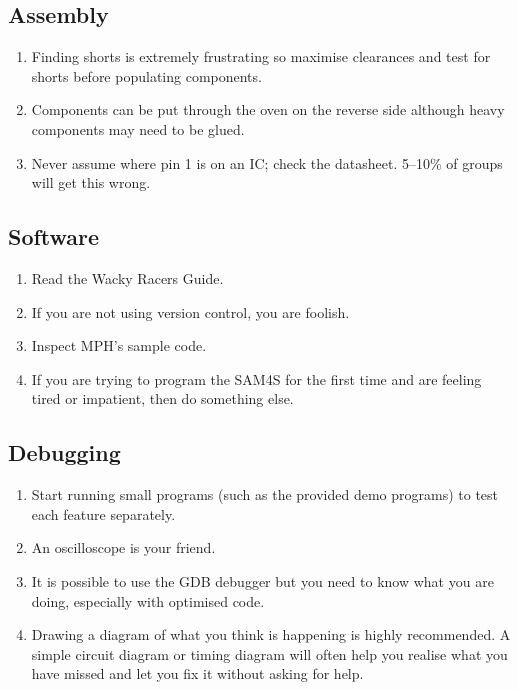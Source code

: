 \documentclass[11pt, a4paper]{article}
\begin{document}
\subsection{Assembly}

\begin{enumerate}
\item Finding shorts is extremely frustrating so maximise clearances
  and test for shorts before populating components.

\item Components can be put through the oven on the reverse side
  although heavy components may need to be glued.

\item Never assume where pin 1 is on an IC; check the datasheet.
  5--10\% of groups will get this wrong.

\end{enumerate}


\subsection{Software}

\begin{enumerate}
\item Read the Wacky Racers Guide.

\item If you are not using version control, you are foolish.

\item Inspect MPH's sample code.

\item If you are trying to program the SAM4S for the first time and
  are feeling tired or impatient, then do something else.  
\end{enumerate}


\subsection{Debugging}

\begin{enumerate}
\item Start running small programs (such as the provided demo
  programs) to test each feature separately.

\item An oscilloscope is your friend.

\item It is possible to use the GDB debugger but you need to know what
  you are doing, especially with optimised code.

\item Drawing a diagram of what you think is happening is highly recommended. A
simple circuit diagram or timing diagram will often help you realise what you
have missed and let you fix it without asking for help.

\end{enumerate}
\end{document}
